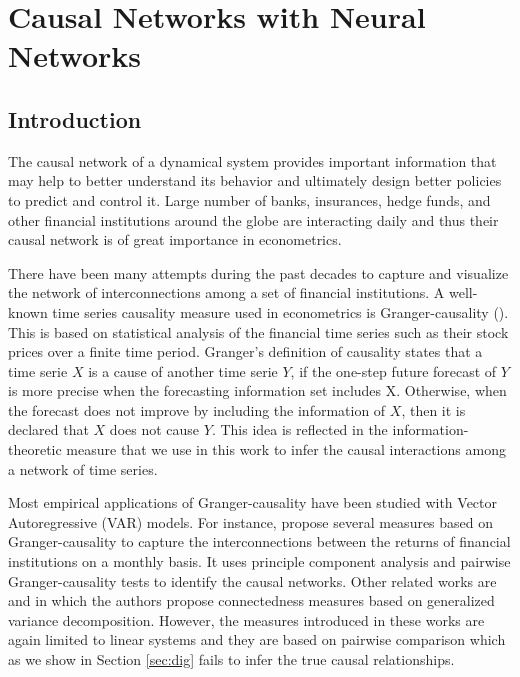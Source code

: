 \chapter{Causal Networks with Neural Networks}

\section{Introduction}\label{S:2.1}

The causal network of a dynamical system provides important information that may help to better understand its behavior and ultimately design better policies to predict and control it. 
Large number of banks, insurances, hedge funds, and other financial institutions around the globe are interacting daily and thus their causal network is of great importance in econometrics.  

There have been many attempts during the past decades to capture and visualize the network of interconnections among a set of financial institutions. 
A well-known time series causality measure used in econometrics is Granger-causality (\citet{granger}).
This is based on statistical analysis of the financial time series such as their stock prices over a finite time period. 
Granger’s definition of causality states that a time serie $X$ is a cause of another time serie $Y$, if the one-step future forecast of $Y$ is more precise when the forecasting information set includes X. 
Otherwise, when the forecast does not improve by including the information of $X$, then it is declared that $X$ does not cause $Y$.
This idea is reflected in the information-theoretic measure that we use in this work to infer the causal interactions among a network of time series.  

Most empirical applications of Granger-causality have been studied with Vector Autoregressive (VAR) models. 
For instance, \citet{billio2012econometric} propose several measures based on Granger-causality to capture the interconnections between the returns of financial institutions on a monthly basis. 
It uses principle component analysis and pairwise Granger-causality tests to identify the causal networks. 
Other related works are \citet{diebold2014network} and \citet{barigozzi2016network} in which the authors propose connectedness measures based on generalized variance decomposition.
However, the measures introduced in these works are again limited to linear systems and they are based on pairwise comparison which as we show in Section  \ref{sec:dig} fails to infer the true causal relationships.

